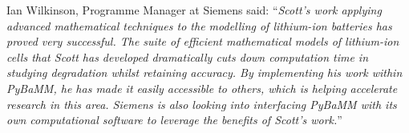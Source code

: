\documentclass[english,a4paper,oneside,9pt]{extarticle}
\begin{document}
Ian Wilkinson, Programme Manager at Siemens said: ``\emph{Scott's work applying advanced mathematical techniques to the modelling of lithium-ion batteries has proved very successful. The suite of efficient mathematical models of lithium-ion cells that Scott has developed dramatically cuts down computation time in studying degradation whilst retaining accuracy. By implementing his work within PyBaMM, he has made it easily accessible to others, which is helping accelerate research in this area. Siemens is also looking into interfacing PyBaMM with its own computational software to leverage the benefits of Scott's work.}''

% 

\clearpage
\end{document}
